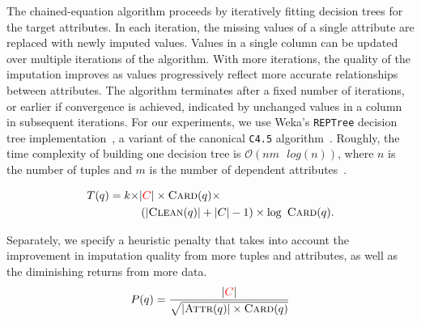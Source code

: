 {%

The chained-equation algorithm proceeds by
iteratively fitting decision trees for the target attributes. 
In each iteration, the missing values of a single attribute are replaced with newly imputed
values. 
Values in a single column can be updated over multiple
iterations of the algorithm. With more iterations, the quality of the
imputation improves as values progressively reflect more accurate relationships
between attributes. The algorithm terminates after a fixed number of
iterations, or earlier if convergence is achieved, indicated by unchanged values in a 
column in subsequent iterations. For our experiments, we use Weka's \texttt{REPTree}
decision tree implementation~\cite{witten2016data}, a variant of the canonical \texttt{C4.5}
algorithm~\cite{quinlan1993}. Roughly, the time complexity of building one
decision tree is $\mathcal{O}(nm \text{ } log(n))$, where $n$ is the number of tuples
and $m$ is the number of dependent attributes~\cite{witten2016data}.

\begin{equation*}
    \begin{aligned}
    T(q) = k \times &|{\color{red}C}| \times \textsc{Card}(q) \times \\
               &\left(|\textsc{Clean}(q)| + |C| - 1\right) \times \log\ \textsc{Card}(q).
    \end{aligned}
\end{equation*}}

Separately, we specify a heuristic penalty that takes into account the
improvement in imputation quality from more tuples and attributes, as well as
the diminishing returns from more data.
\[
    P(q) = \frac{|{\color{red}C}|}{\sqrt{ |\textsc{Attr}(q)| \times \textsc{Card}(q)}}
\]

